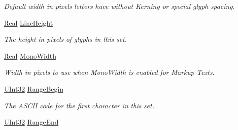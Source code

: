 \begin{DoxyCompactItemize}
\begin{DoxyCompactList}\small\item\em Default width in pixels letters have without Kerning or special glyph spacing. \item\end{DoxyCompactList}\item 
\hypertarget{classMezzanine_1_1UI_1_1GlyphData_a11ea4040f0a854226a39f7f3a5dacf58}{
\hyperlink{namespaceMezzanine_a726731b1a7df72bf3583e4a97282c6f6}{Real} \hyperlink{classMezzanine_1_1UI_1_1GlyphData_a11ea4040f0a854226a39f7f3a5dacf58}{LineHeight}}
\label{classMezzanine_1_1UI_1_1GlyphData_a11ea4040f0a854226a39f7f3a5dacf58}

\begin{DoxyCompactList}\small\item\em The height in pixels of glyphs in this set. \item\end{DoxyCompactList}\item 
\hypertarget{classMezzanine_1_1UI_1_1GlyphData_a22cca705efbdce378d4e3551363f4988}{
\hyperlink{namespaceMezzanine_a726731b1a7df72bf3583e4a97282c6f6}{Real} \hyperlink{classMezzanine_1_1UI_1_1GlyphData_a22cca705efbdce378d4e3551363f4988}{MonoWidth}}
\label{classMezzanine_1_1UI_1_1GlyphData_a22cca705efbdce378d4e3551363f4988}

\begin{DoxyCompactList}\small\item\em Width in pixels to use when MonoWidth is enabled for Markup Texts. \item\end{DoxyCompactList}\item 
\hypertarget{classMezzanine_1_1UI_1_1GlyphData_a6a9c308d28252c9b0fd829c7ad4bd4a7}{
\hyperlink{namespaceMezzanine_abea3b8e8e9b03d2547b2800284ba682d}{UInt32} \hyperlink{classMezzanine_1_1UI_1_1GlyphData_a6a9c308d28252c9b0fd829c7ad4bd4a7}{RangeBegin}}
\label{classMezzanine_1_1UI_1_1GlyphData_a6a9c308d28252c9b0fd829c7ad4bd4a7}

\begin{DoxyCompactList}\small\item\em The ASCII code for the first character in this set. \item\end{DoxyCompactList}\item 
\hypertarget{classMezzanine_1_1UI_1_1GlyphData_ac3a9d7ff6c23a2613e3c422e61da317d}{
\hyperlink{namespaceMezzanine_abea3b8e8e9b03d2547b2800284ba682d}{UInt32} \hyperlink{classMezzanine_1_1UI_1_1GlyphData_ac3a9d7ff6c23a2613e3c422e61da317d}{RangeEnd}}
\label{classMezzanine_1_1UI_1_1GlyphData_ac3a9d7ff6c23a2613e3c422e61da317d}


\end{DoxyCompactItemize}

